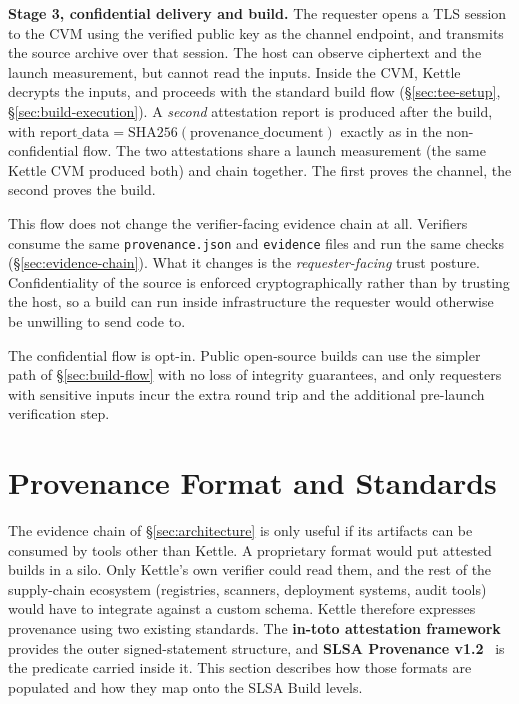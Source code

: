\documentclass[11pt]{article}
\begin{document}
\textbf{Stage 3, confidential delivery and build.} The requester opens a TLS session to the CVM using the verified public key as the channel endpoint, and transmits the source archive over that session. The host can observe ciphertext and the launch measurement, but cannot read the inputs. Inside the CVM, Kettle decrypts the inputs, and proceeds with the standard build flow (\S\ref{sec:tee-setup}, \S\ref{sec:build-execution}). A \emph{second} attestation report is produced after the build, with $\mathrm{report\_data} = \mathrm{SHA256}(\mathrm{provenance\_document})$ exactly as in the non-confidential flow. The two attestations share a launch measurement (the same Kettle CVM produced both) and chain together. The first proves the channel, the second proves the build.

This flow does not change the verifier-facing evidence chain at all. Verifiers consume the same \texttt{provenance.json} and \texttt{evidence} files and run the same checks (\S\ref{sec:evidence-chain}). What it changes is the \emph{requester-facing} trust posture. Confidentiality of the source is enforced cryptographically rather than by trusting the host, so a build can run inside infrastructure the requester would otherwise be unwilling to send code to.

The confidential flow is opt-in. Public open-source builds can use the simpler path of \S\ref{sec:build-flow} with no loss of integrity guarantees, and only requesters with sensitive inputs incur the extra round trip and the additional pre-launch verification step.

\section{Provenance Format and Standards}
\label{sec:provenance-format}

The evidence chain of \S\ref{sec:architecture} is only useful if its artifacts can be consumed by tools other than Kettle. A proprietary format would put attested builds in a silo. Only Kettle's own verifier could read them, and the rest of the supply-chain ecosystem (registries, scanners, deployment systems, audit tools) would have to integrate against a custom schema. Kettle therefore expresses provenance using two existing standards. The \textbf{in-toto attestation framework}~\cite{ref:in-toto} provides the outer signed-statement structure, and \textbf{SLSA Provenance v1.2}~\cite{ref:slsa-provenance} is the predicate carried inside it. This section describes how those formats are populated and how they map onto the SLSA Build levels.
\end{document}
